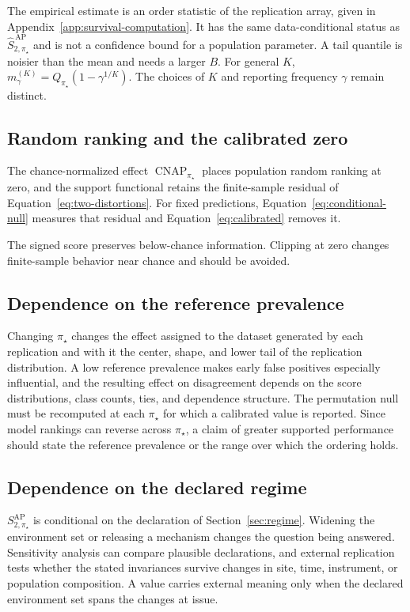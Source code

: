 \documentclass[11pt]{article}
\newcommand{\CNAP}{\operatorname{CNAP}}
\newcommand{\Tpi}{\CNAP_{\pi_\star}}
\newcommand{\SAP}{S_{2,\pi_\star}^{\mathrm{AP}}}
\newcommand{\SAPHat}{\widehat S_{2,\pi_\star}^{\,\mathrm{AP}}}
\theoremstyle{remark}
\begin{document}
The empirical estimate is an order statistic of the replication array, given in Appendix~\ref{app:survival-computation}. It has the same data-conditional status as $\SAPHat$ and is not a confidence bound for a population parameter. A tail quantile is noisier than the mean and needs a larger $B$. For general $K$, $m_\gamma^{(K)}=Q_{\pi_\star}(1-\gamma^{1/K})$. The choices of $K$ and reporting frequency $\gamma$ remain distinct.

\subsection{Random ranking and the calibrated zero}

The chance-normalized effect $\Tpi$ places population random ranking at zero, and the support functional retains the finite-sample residual of Equation~\eqref{eq:two-distortions}. For fixed predictions, Equation~\eqref{eq:conditional-null} measures that residual and Equation~\eqref{eq:calibrated} removes it.

The signed score preserves below-chance information. Clipping at zero changes finite-sample behavior near chance and should be avoided.

\subsection{Dependence on the reference prevalence}

Changing $\pi_\star$ changes the effect assigned to the dataset generated by each replication and with it the center, shape, and lower tail of the replication distribution. A low reference prevalence makes early false positives especially influential, and the resulting effect on disagreement depends on the score distributions, class counts, ties, and dependence structure. The permutation null must be recomputed at each $\pi_\star$ for which a calibrated value is reported. Since model rankings can reverse across $\pi_\star$, a claim of greater supported performance should state the reference prevalence or the range over which the ordering holds.

\subsection{Dependence on the declared regime}

$\SAP$ is conditional on the declaration of Section~\ref{sec:regime}. Widening the environment set or releasing a mechanism changes the question being answered. Sensitivity analysis can compare plausible declarations, and external replication tests whether the stated invariances survive changes in site, time, instrument, or population composition. A value carries external meaning only when the declared environment set spans the changes at issue.
\end{document}
